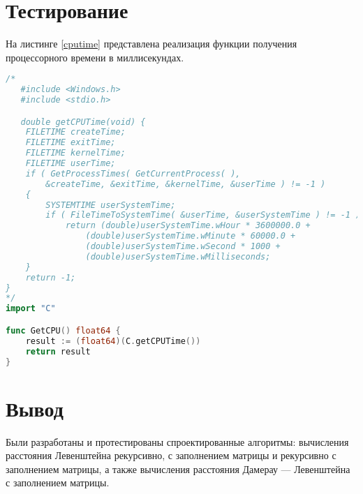 \section{Тестирование}
На листинге \ref{cputime} представлена реализация функции получения процессорного времени \cite{getCPUTime} в миллисекундах.
\begin{lstlisting}[language=Go, caption=Измерение процессорного времени, label=cputime]
/*
   #include <Windows.h>
   #include <stdio.h>

   double getCPUTime(void) {
    FILETIME createTime;
    FILETIME exitTime;
    FILETIME kernelTime;
    FILETIME userTime;
    if ( GetProcessTimes( GetCurrentProcess( ),
        &createTime, &exitTime, &kernelTime, &userTime ) != -1 )
    {
        SYSTEMTIME userSystemTime;
        if ( FileTimeToSystemTime( &userTime, &userSystemTime ) != -1 )
            return (double)userSystemTime.wHour * 3600000.0 +
                (double)userSystemTime.wMinute * 60000.0 +
                (double)userSystemTime.wSecond * 1000 +
                (double)userSystemTime.wMilliseconds;
    }
    return -1;
}
*/
import "C"

func GetCPU() float64 {
	result := (float64)(C.getCPUTime())
	return result
}
\end{lstlisting}


\section*{Вывод}

Были разработаны и протестированы спроектированные алгоритмы: вычисления расстояния Левенштейна рекурсивно, с заполнением матрицы и рекурсивно с заполнением матрицы, а также вычисления расстояния Дамерау — Левенштейна с заполнением матрицы.
